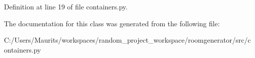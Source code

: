 Definition at line 19 of file containers.\+py.



The documentation for this class was generated from the following file\+:\begin{DoxyCompactItemize}
\item 
C\+:/\+Users/\+Maurits/workspaces/random\+\_\+project\+\_\+workspace/roomgenerator/src/containers.\+py\end{DoxyCompactItemize}
